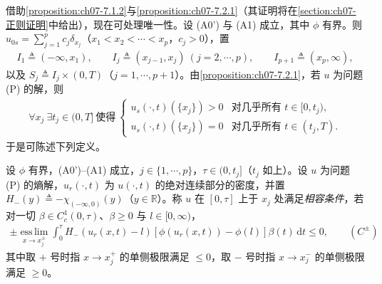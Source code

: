 \documentclass[../../main.tex]{subfiles}%
\begin{document}
借助\cref{proposition:ch07-7.1.2}与\cref{proposition:ch07-7.2.1}（其证明将在\cref{section:ch07-正则证明}中给出），现在可处理唯一性。设 (A0') 与 (A1) 成立，其中 $\phi$ 有界。则 $u_{0s}=\sum_{j=1}^pc_j\delta_{x_j}$（$x_1<x_2<\cdots<x_p$，$c_j>0$），置
\begin{align*}
I_1\triangleq(-\infty,x_1),\qquad I_j\triangleq(x_{j-1},x_j)\ (j=2,\cdots,p),\qquad I_{p+1}\triangleq(x_p,\infty),
\end{align*}
以及 $S_j\triangleq I_j\times(0,T)$（$j=1,\cdots,p+1$）。由\cref{proposition:ch07-7.2.1}，若 $u$ 为问题 (P) 的解，则
\begin{align*}
\forall x_j\ \exists t_j\in(0,T]\ \text{使得}\
\begin{cases}
u_s(\cdot,t)(\{x_j\})>0 & \text{对几乎所有 }t\in[0,t_j),\\
u_s(\cdot,t)(\{x_j\})=0 & \text{对几乎所有 }t\in(t_j,T).
\end{cases}
\end{align*}
于是可陈述下列定义。

\begin{definition}\label{definition:ch07-相容条件}
设 $\phi$ 有界，(A0')--(A1) 成立，$j\in\{1,\cdots,p\}$，$\tau\in(0,t_j]$（$t_j$ 如上）。设 $u$ 为问题 (P) 的熵解，$u_r(\cdot,t)$ 为 $u(\cdot,t)$ 的绝对连续部分的密度，并置 $H_-(y)\triangleq-\chi_{(-\infty,0)}(y)$（$y\in\mathbb{R}$）。称 $u$ 在 $[0,\tau]$ 上于 $x_j$ 处满足\emph{相容条件}，若对一切 $\beta\in C^1_c(0,\tau)$、$\beta\geqslant0$ 与 $l\in[0,\infty)$，
\begin{align*}
\pm\operatorname*{ess\,lim}_{x\to x_j^\pm}\int_0^\tau H_-(u_r(x,t)-l)[\phi(u_r(x,t))-\phi(l)]\beta(t)\,\mathrm{d}t\leqslant0, \qquad(C^\pm)
\end{align*}
其中取 $+$ 号时指 $x\to x_j^+$ 的单侧极限满足 $\leqslant0$，取 $-$ 号时指 $x\to x_j^-$ 的单侧极限满足 $\geqslant0$。
\end{definition}
\end{document}
